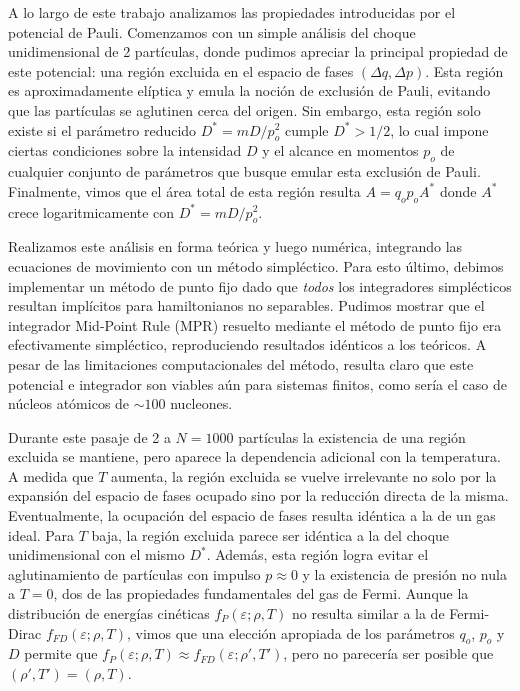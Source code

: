 A lo largo de este trabajo analizamos las propiedades introducidas por el potencial de Pauli.
Comenzamos con un simple análisis del choque unidimensional de 2 partículas, donde pudimos apreciar la principal propiedad de este potencial: una región excluida en el espacio de fases $(\Delta q, \Delta p)$.
Esta región es aproximadamente elíptica y emula la noción de exclusión de Pauli, evitando que las partículas se aglutinen cerca del origen.
Sin embargo, esta región solo existe si el parámetro reducido $D^*=mD/p_o^2$ cumple $D^*>1/2$, lo cual impone ciertas condiciones sobre la intensidad $D$ y el alcance en momentos $p_o$ de cualquier conjunto de 
parámetros que busque emular esta exclusión de Pauli.
Finalmente, vimos que el área total de esta región resulta $A=q_op_oA^*$ donde $A^*$ crece logaritmicamente con $D^*=mD/p_o^2$.

Realizamos este análisis en forma teórica y luego numérica, integrando las ecuaciones de movimiento con un método simpléctico.
Para esto último, debimos implementar un método de punto fijo dado que \textit{todos} los integradores simplécticos resultan implícitos para hamiltonianos no separables.
Pudimos mostrar que el integrador Mid-Point Rule (MPR) resuelto mediante el método de punto fijo era efectivamente simpléctico, reproduciendo resultados idénticos a los teóricos.
A pesar de las limitaciones computacionales del método, resulta claro que este potencial e integrador son viables aún para sistemas finitos, como sería el caso de núcleos atómicos de $\sim 100$ nucleones.

Durante este pasaje de 2 a $N=1000$ partículas la existencia de una región excluida se mantiene, pero aparece la dependencia adicional con la temperatura.
A medida que $T$ aumenta, la región excluida se vuelve irrelevante no solo por la expansión del espacio de fases ocupado sino por la reducción directa de la misma. 
Eventualmente, la ocupación del espacio de fases resulta idéntica a la de un gas ideal.
Para $T$ baja, la región excluida parece ser idéntica a la del choque unidimensional con el mismo $D^*$.
Además, esta región logra evitar el aglutinamiento de partículas con impulso $p\approx0$ y la existencia de presión no nula a $T=0$, dos de las propiedades fundamentales del gas de Fermi.
Aunque la distribución de energías cinéticas $f_P(\varepsilon;\rho,T)$ no resulta similar a la de Fermi-Dirac $f_{FD}(\varepsilon;\rho,T)$, vimos que una elección apropiada de los parámetros $q_o$, $p_o$ y $D$ 
permite que $f_P(\varepsilon;\rho,T)\approx f_{FD}(\varepsilon;\rho',T')$, pero no parecería ser posible que $(\rho',T') = (\rho, T)$.

